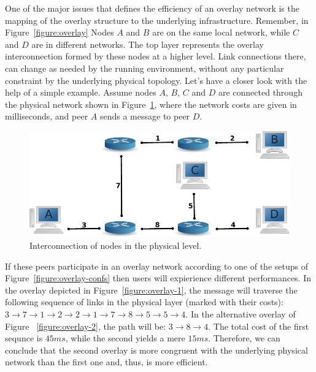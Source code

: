 One of the major issues that defines the efficiency of an overlay network is the
mapping of the overlay structure to the underlying infrastructure. Remember, in
Figure~\ref{figure:overlay} Nodes $A$ and $B$ are on the same local network,
while $C$ and $D$ are in different networks. The top layer represents the
overlay interconnection formed by these nodes at a higher level. Link
connections there, can change as needed by the running environment, without any
particular constraint by the underlying physical topology. Let's have a closer
look with the help of a simple example. Assume nodes $A$, $B$, $C$ and $D$ are
connected through the physical network shown in Figure~\ref{figure:phys}, where
the network costs are given in milliseconds, and peer $A$ sends a message to
peer $D$.

\begin{figure}
\centering
  \includegraphics[scale=0.8]{img/phys.pdf}
\caption{Interconnection of nodes in the physical level.}
\label{figure:phys}
\end{figure}

If these peers participate in an overlay network according to one of the setups
of Figure~\ref{figure:overlay-confs} then users will expierience different
performances. In the overlay depicted in Figure~\ref{figure:overlay-1}, the
message will traverse the following sequence of links in the physical layer
(marked with their costs): $3 \rightarrow 7 \rightarrow 1 \rightarrow 2
\rightarrow 2 \rightarrow 1 \rightarrow 7 \rightarrow 8 \rightarrow 5
\rightarrow 5 \rightarrow 4$. In the alternative overlay of Figure
~\ref{figure:overlay-2}, the path will be: $3 \rightarrow 8 \rightarrow 4$. The
total cost of the first sequnce is $45 ms$, while the second yields a mere $15
ms$. Therefore, we can conclude that the second overlay is more congruent with
the underlying physical network than the first one and, thus, is more efficient.

